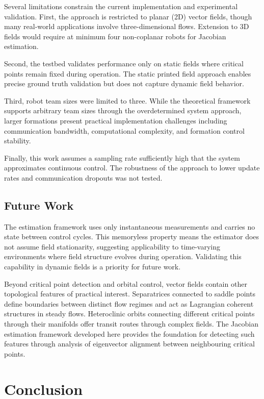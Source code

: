 \documentclass[lettersize,journal]{IEEEtran}
\begin{document}
Several limitations constrain the current implementation and experimental validation. First, the approach is restricted to planar (2D) vector fields, though many real-world applications involve three-dimensional flows. Extension to 3D fields would require at minimum four non-coplanar robots for Jacobian estimation.

Second, the testbed validates performance only on static fields where critical points remain fixed during operation. The static printed field approach enables precise ground truth validation but does not capture dynamic field behavior.

Third, robot team sizes were limited to three. While the theoretical framework supports arbitrary team sizes through the overdetermined system approach, larger formations present practical implementation challenges including communication bandwidth, computational complexity, and formation control stability.

Finally, this work assumes a sampling rate sufficiently high that the system approximates continuous control. The robustness of the approach to lower update rates and communication dropouts was not tested.

\subsection{Future Work}


The estimation framework uses only instantaneous measurements and carries no state between control cycles. This memoryless property 
means the estimator does not assume field stationarity, suggesting applicability to time-varying environments where field structure 
evolves during operation. Validating this capability in dynamic fields is a priority for future work.

Beyond critical point detection and orbital control, vector fields contain other topological features of practical interest. 
Separatrices connected to saddle points define boundaries between distinct flow regimes and act as Lagrangian coherent structures in 
steady flows. Heteroclinic orbits connecting different critical points through their manifolds offer transit routes through complex 
fields. The Jacobian estimation framework developed here provides the foundation for detecting such features through analysis of 
eigenvector alignment between neighbouring critical points.



\section{Conclusion}
\noindent
\end{document}
